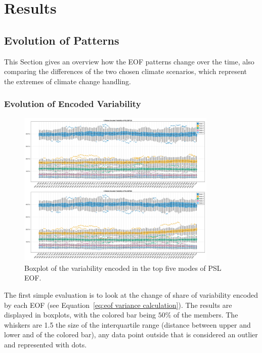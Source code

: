 \chapter{Results}
\label{ch:results}


\section{Evolution of Patterns}

This Section gives an overview how the EOF patterns change over the time, also comparing the differences of the two chosen climate scenarios, which represent the extremes of climate change handling.   

\subsection{Evolution of Encoded Variability}



\begin{figure}[htb]
  \begin{center}
    \includegraphics[width=0.85\textwidth]{figures/mode_variability_psl_50seasons.png}
  \end{center}
  \caption{Boxplot of the variability encoded in the top five modes of PSL EOF.}\label{fig:psl mode variability}
\end{figure}

The first simple evaluation is to look at the change of share of variability encoded by each EOF (see Equation~\ref{eq:eof variance calculation}). 
The results are displayed in boxplots, with the colored bar being $50\%$  of the members. 
The whiskers are 1.5 the size of the interquartile range (distance between upper and lower and of the colored bar), any data point outside that is considered an outlier and represented with dots. 



